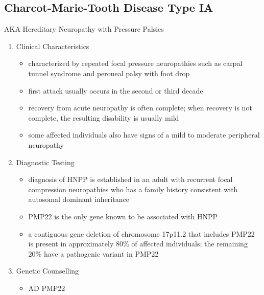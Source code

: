 \documentclass[12pt]{scrartcl}
\begin{document}
\subsection{Charcot-Marie-Tooth Disease Type IA}
\label{sec:org2431e07}
AKA Hereditary Neuropathy with Pressure Palsies
\begin{enumerate}
\item Clinical Characteristics
\label{sec:org23672ce}
\begin{itemize}
\item characterized by repeated focal pressure neuropathies such as carpal
tunnel syndrome and peroneal palsy with foot drop
\item first attack usually occurs in the second or third decade
\item recovery from acute neuropathy is often complete; when recovery is
not complete, the resulting disability is usually mild
\item some affected individuals also have signs of a mild to moderate
peripheral neuropathy
\end{itemize}
\item Diagnostic Testing
\label{sec:org40ef629}
\begin{itemize}
\item diagnosis of HNPP is established in an adult with recurrent focal
compression neuropathies who has a family history consistent with
autosomal dominant inheritance
\item PMP22 is the only gene known to be associated with HNPP
\item a contiguous gene deletion of chromosome 17p11.2 that includes PMP22
is present in approximately 80\% of affected individuals; the
remaining 20\% have a pathogenic variant in PMP22
\end{itemize}
\item Genetic Counselling
\label{sec:org6ecad21}
\begin{itemize}
\item AD PMP22
\end{itemize}
\end{enumerate}
\end{document}
